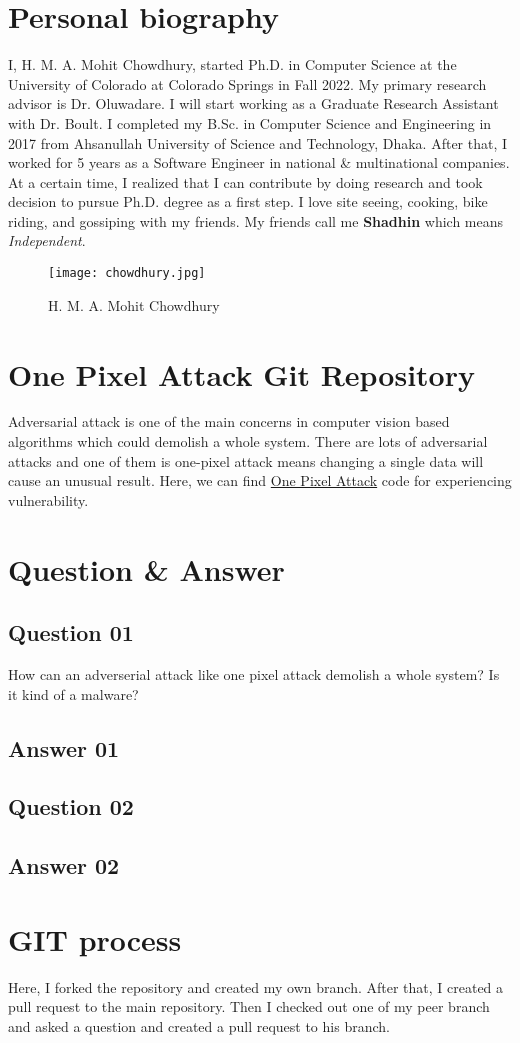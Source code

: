 \documentclass[11pt, letterpaper]{article}
\begin{document}
\section{Personal biography}
I, H. M. A. Mohit Chowdhury, started Ph.D. in Computer Science at the University of Colorado at Colorado Springs in Fall 2022. My primary research advisor is Dr. Oluwadare. I will start working as a Graduate Research Assistant with Dr. Boult. I completed my B.Sc. in Computer Science and Engineering in 2017 from Ahsanullah University of Science and Technology, Dhaka. After that, I worked for 5 years as a Software Engineer in national \& multinational companies. At a certain time, I realized that I can contribute by doing research and took decision to pursue Ph.D. degree as a first step. I love site seeing, cooking, bike riding, and gossiping with my friends. My friends call me \textbf{Shadhin} which means \textit{Independent}.

\begin{figure}[H] \center
    \texttt{[image: chowdhury.jpg]}
    \caption{H. M. A. Mohit Chowdhury}
    \label{fig:chowdhury}
\end{figure}

\section{One Pixel Attack Git Repository}
Adversarial attack is one of the main concerns in computer vision based algorithms which could demolish a whole system. There are lots of adversarial attacks and one of them is one-pixel attack means changing a single data will cause an unusual result. Here, we can find \href{https://github.com/Hyperparticle/one-pixel-attack-keras}{One Pixel Attack} code for experiencing vulnerability.

\section{Question \& Answer}
\subsection{Question 01} How can an adverserial attack like one pixel attack demolish a whole system? Is it kind of a malware? 
\subsection{Answer 01}
\subsection{Question 02}
\subsection{Answer 02}
\section{GIT process}
Here, I forked the repository and created my own branch. After that, I created a pull request to the main repository. Then I checked out one of my peer branch and asked a question and created a pull request to his branch.
\end{document}
